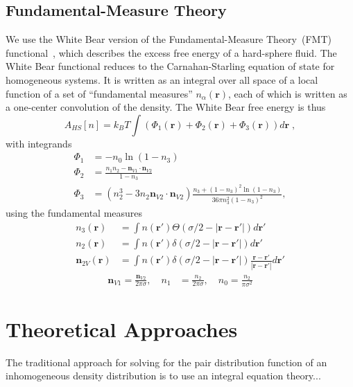 \documentclass[letterpaper,twocolumn,amsmath,amssymb,pre]{revtex4-1}
\newcommand{\rr}{\textbf{r}}
\begin{document}
\subsection*{Fundamental-Measure Theory}

We use the White Bear version of the Fundamental-Measure Theory~(FMT)
functional~\cite{roth2002whitebear}, which describes the excess free
energy of a hard-sphere fluid.  The White Bear functional reduces to
the Carnahan-Starling equation of state for homogeneous systems.  It
is written as an integral over all space of a local function of a set
of ``fundamental measures'' $n_\alpha(\rr)$, each of which is written
as a one-center convolution of the density.  The White Bear free
energy is thus
\begin{equation}
A_{\textit{HS}}[n] = k_B T \int \left(\Phi_1(\rr) + \Phi_2(\rr) + \Phi_3(\rr)\right) d\rr \; ,
\end{equation}
with integrands
\begin{align}
\Phi_1 &= -n_0 \ln\left( 1 - n_3\right) \label{eq:Phi1}\\
\Phi_2 &= \frac{n_1 n_2 - \mathbf{n}_{V1} \cdot\mathbf{n}_{V2}}{1-n_3} \\
\Phi_3 &= (n_2^3 - 3 n_2 \mathbf{n}_{V2} \cdot \mathbf{n}_{V2}) \frac{
  n_3 + (1-n_3)^2 \ln(1-n_3)
}{
  36\pi n_3^2\left( 1 - n_3 \right)^2
} , \label{eq:Phi3}
\end{align}
using the fundamental measures
\begin{align}
  n_3(\rr) &= \int n(\rr') \Theta(\sigma/2 -\left|\rr - \rr'\right|)
  d\rr' \label{eq:FMn3} \\
  n_2(\rr) &= \int n(\rr') \delta(\sigma/2 -\left|\rr - \rr'\right|) d\rr' \\
  \mathbf{n}_{2V}(\rr) &= \int n(\rr') \delta(\sigma/2 -\left|\rr - \rr'\right|) \frac{\rr-\rr'}{|\rr-\rr'|}d\rr'
\end{align}
\begin{align}
  \mathbf{n}_{V1} = \frac{\mathbf{n}_{V2}}{2\pi \sigma}, \quad
  n_1 &= \frac{n_2}{2\pi \sigma} , \quad
  n_0 = \frac{n_2}{\pi \sigma^2} \label{eq:FMrest}
\end{align}


\section{Theoretical Approaches}

The traditional approach for solving for the pair distribution
function of an inhomogeneous density distribution is to use an
integral equation theory...
\end{document}
